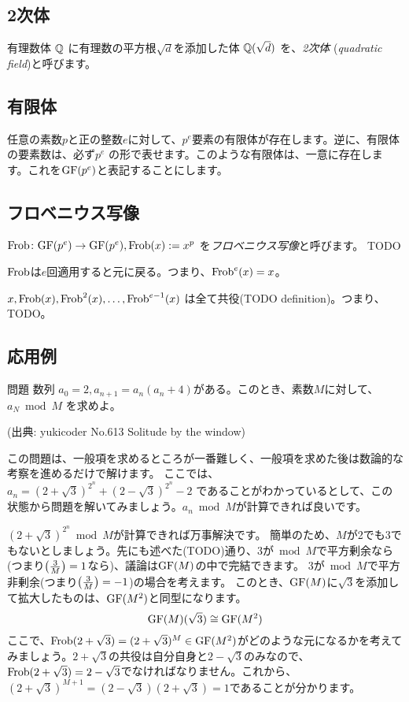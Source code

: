 \documentclass{jsarticle}
\begin{document}
  \subsection{2次体}
  \label{subsec:quadratic-field}
  有理数体 $\mathbb{Q}$ に有理数の平方根$\sqrt{d}$を添加した体 $\mathbb{Q}(\sqrt{d})$ を、\emph{2次体} (\emph{quadratic field})と呼びます。
  \subsection{有限体}
  任意の素数$p$と正の整数$e$に対して、$p^e$要素の有限体が存在します。逆に、有限体の要素数は、必ず$p^e$ の形で表せます。このような有限体は、一意に存在します。これを$\mathrm{GF}(p^e)$と表記することにします。
  \subsection{フロベニウス写像}
  $\mathrm{Frob} \colon \mathrm{GF}(p^e) \to \mathrm{GF}(p^e), \mathrm{Frob}(x) := x^p$ を\emph{フロベニウス写像}と呼びます。 TODO
  \begin{proposition}
   $\mathrm{Frob}$は$e$回適用すると元に戻る。つまり、$\mathrm{Frob}^e(x) = x$。
  \end{proposition}
  \begin{proposition}
   $x, \mathrm{Frob}(x), \mathrm{Frob}^2(x), \ldots, \mathrm{Frob}^{e-1}(x)$ は全て共役(TODO definition)。つまり、TODO。
  \end{proposition}
  \subsection{応用例}
  \label{subsec:application-of-frobenius}
  \begin{itembox}[l]{問題}
   数列 $a_0 = 2, a_{n+1} = a_n(a_n+4)$がある。このとき、素数$M$に対して、$a_N \bmod M$ を求めよ。

   (出典: yukicoder No.613 Solitude by the window)
  \end{itembox}
  この問題は、一般項を求めるところが一番難しく、一般項を求めた後は数論的な考察を進めるだけで解けます。
  ここでは、$a_n = (2+\sqrt{3})^{2^n} + (2-\sqrt{3})^{2^n} - 2$ であることがわかっているとして、この状態から問題を解いてみましょう。$a_n \bmod M$が計算できれば良いです。

  $(2+\sqrt{3})^{2^n} \bmod M$が計算できれば万事解決です。
  簡単のため、$M$が2でも3でもないとしましょう。先にも述べた(TODO)通り、3が${}\bmod M$で平方剰余なら(つまり$\left(\frac{3}{M}\right)=1$なら)、議論は$\mathrm{GF}(M)$の中で完結できます。
  3が${}\bmod M$で平方非剰余(つまり$\left(\frac{3}{M}\right)=-1$)の場合を考えます。
  このとき、$\mathrm{GF}(M)$に$\sqrt{3}$を添加して拡大したものは、$\mathrm{GF}(M^2)$と同型になります。
  \begin{displaymath}
   \mathrm{GF}(M)(\sqrt{3}) \cong \mathrm{GF}(M^2)
  \end{displaymath}
  ここで、$\mathrm{Frob}(2+\sqrt{3}) = (2+\sqrt{3})^M \in \mathrm{GF}(M^2)$がどのような元になるかを考えてみましょう。$2+\sqrt{3}$の共役は自分自身と$2-\sqrt{3}$のみなので、$\mathrm{Frob}(2+\sqrt{3})=2-\sqrt{3}$でなければなりません。これから、$(2+\sqrt{3})^{M+1}=(2-\sqrt{3})(2+\sqrt{3})=1$であることが分かります。
\end{document}
